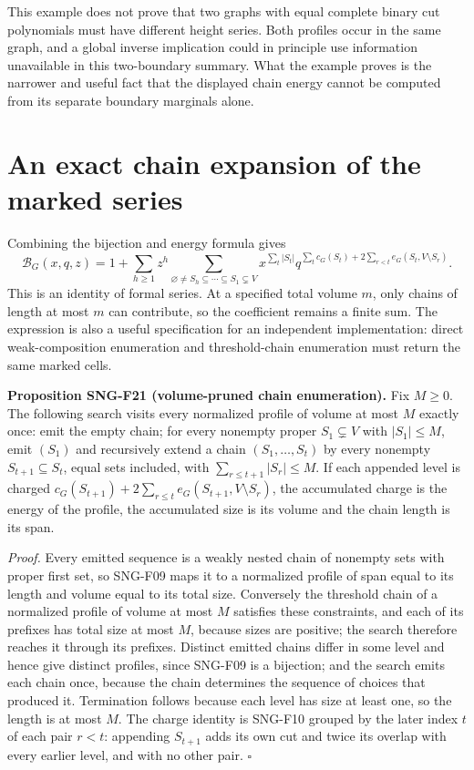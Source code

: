 \documentclass[
  11pt,
  a4paper,
]{report}
\begin{document}
This example does not prove that two graphs with equal complete binary
cut polynomials must have different height series. Both profiles occur
in the same graph, and a global inverse implication could in principle
use information unavailable in this two-boundary summary. What the
example proves is the narrower and useful fact that the displayed chain
energy cannot be computed from its separate boundary marginals alone.

\hypertarget{an-exact-chain-expansion-of-the-marked-series}{%
\section{An exact chain expansion of the marked
series}\label{an-exact-chain-expansion-of-the-marked-series}}

Combining the bijection and energy formula gives \[
\mathcal B_G(x,q,z)=1+
\sum_{h\ge1}z^h
\sum_{\varnothing\ne S_h\subseteq\cdots\subseteq S_1\subsetneq V}
x^{\sum_t|S_t|}
q^{\sum_t c_G(S_t)+2\sum_{r<t}e_G(S_t,V\setminus S_r)}.
\] This is an identity of formal series. At a specified total volume
\(m\), only chains of length at most \(m\) can contribute, so the
coefficient remains a finite sum. The expression is also a useful
specification for an independent implementation: direct weak-composition
enumeration and threshold-chain enumeration must return the same marked
cells.

\textbf{Proposition SNG-F21 (volume-pruned chain enumeration).} Fix
\(M\ge0\). The following search visits every normalized profile of
volume at most \(M\) exactly once: emit the empty chain; for every
nonempty proper \(S_1\subsetneq V\) with \(|S_1|\le M\), emit \((S_1)\)
and recursively extend a chain \((S_1,\ldots,S_t)\) by every nonempty
\(S_{t+1}\subseteq S_t\), equal sets included, with
\(\sum_{r\le t+1}|S_r|\le M\). If each appended level is charged
\(c_G(S_{t+1})+2\sum_{r\le t}e_G(S_{t+1},V\setminus S_r)\), the
accumulated charge is the energy of the profile, the accumulated size is
its volume and the chain length is its span.

\emph{Proof.} Every emitted sequence is a weakly nested chain of
nonempty sets with proper first set, so SNG-F09 maps it to a normalized
profile of span equal to its length and volume equal to its total size.
Conversely the threshold chain of a normalized profile of volume at most
\(M\) satisfies these constraints, and each of its prefixes has total
size at most \(M\), because sizes are positive; the search therefore
reaches it through its prefixes. Distinct emitted chains differ in some
level and hence give distinct profiles, since SNG-F09 is a bijection;
and the search emits each chain once, because the chain determines the
sequence of choices that produced it. Termination follows because each
level has size at least one, so the length is at most \(M\). The charge
identity is SNG-F10 grouped by the later index \(t\) of each pair
\(r<t\): appending \(S_{t+1}\) adds its own cut and twice its overlap
with every earlier level, and with no other pair. \(\square\)
\end{document}
